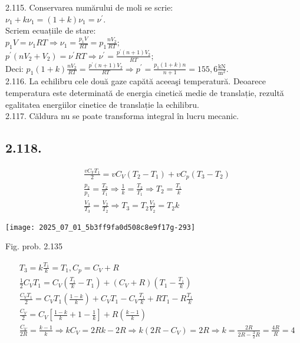 2.115. Conservarea numărului de moli se scrie:\\ $\nu_{1}+k \nu_{1}=(1+k) \nu_{1}=\nu^{\prime}$.\\ Scriem ecuațiile de stare:\\ $p_{1} V=\nu_{1} R T \Rightarrow \nu_{1}=\frac{p_{1} V}{R T}=p_{1} \frac{n V_{2}}{R T};$\\ $p^{\prime}\left(n V_{2}+V_{2}\right)=\nu^{\prime} R T \Rightarrow \nu^{\prime}=\frac{p^{\prime}(n+1) V_{2}}{R T}$;\\ Deci: $p_{1}(1+k) \frac{n V_{2}}{R T}=\frac{p^{\prime}(n+1) V_{2}}{R T} \Rightarrow p^{\prime}=\frac{p_{1}(1+k) n}{n+1}=155,6 \frac{\mathrm{kN}}{\mathrm{m}^{2}}$.\\

2.116. La echilibru cele două gaze capătă aceeaşi temperatură. Deoarece temperatura este determinată de energia cinetică medie de translație, rezultă egalitatea energiilor cinetice de translație la echilibru.\\

2.117. Căldura nu se poate transforma integral în lucru mecanic.

\subsection*{2.118.}
$$
\begin{aligned}
& \frac{v C_{V} T_{1}}{2}=v C_{V}\left(T_{2}-T_{1}\right)+v C_{p}\left(T_{3}-T_{2}\right) \\
& \frac{p_{2}}{p_{1}}=\frac{T_{2}}{T_{1}} \Rightarrow \frac{1}{k}=\frac{T_{2}}{T_{1}} \Rightarrow T_{2}=\frac{T_{1}}{k} \\
& \frac{V_{3}}{T_{3}}=\frac{V_{2}}{T_{2}} \Rightarrow T_{3}=T_{2} \frac{V_{3}}{V_{2}}=T_{2} k
\end{aligned}
$$

\begin{center}
\texttt{[image: 2025\_07\_01\_5b3ff9fa0d508c8e9f17g-293]}
\end{center}

Fig. prob. 2.135

$$
\begin{aligned}
& T_{3}=k \frac{T_{1}}{k}=T_{1}, C_{p}=C_{V}+R \\
& \frac{1}{2} C_{V} T_{1}=C_{V}\left(\frac{T_{1}}{k}-T_{1}\right)+\left(C_{V}+R\right)\left(T_{1}-\frac{T_{1}}{k}\right) \\
& \frac{C_{V} T_{1}}{2}=C_{V} T_{1}\left(\frac{1-k}{k}\right)+C_{V} T_{1}-C_{V} \frac{T_{1}}{k}+R T_{1}-R \frac{T_{1}}{k} \\
& \frac{C_{V}}{2}=C_{V}\left[\frac{1-k}{k}+1-\frac{1}{k}\right]+R\left(\frac{k-1}{k}\right) \\
& \frac{C_{V}}{2 R}=\frac{k-1}{k} \Rightarrow k C_{V}=2 R k-2 R \Rightarrow k\left(2 R-C_{V}\right)=2 R \Rightarrow k=\frac{2 R}{2 R-\frac{3}{2} R}=\frac{4 R}{R}=4
\end{aligned}
$$

